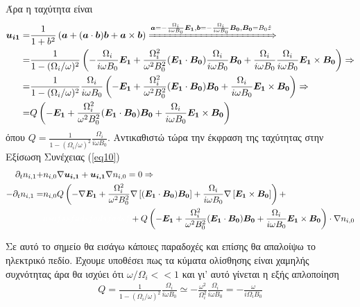 \documentclass[a4paper]{article}
\begin{document}
        Άρα η ταχύτητα είναι 
            \begin{align*}
                \bm{u_{i1}} =& \frac{1}{1+b^2}\left( \bm{a}+(\bm{a}\cdot\bm{b})\bm{b}+\bm{a}\times\bm{b}\right) \xRightarrow{\bm{a} = -\frac{\Omega_{i}}{i\omega B_0}\bm{E_1}, \bm{b} = - \frac{\Omega_i}{i\omega B_0}\bm{B_0}, \bm{B_0}=B_0\hat{z}}\\
                    =& \frac{1}{1-(\Omega_{i}/\omega)^2}\left( -\frac{\Omega_{i}}{i\omega B_0}\bm{E_1} + \frac{\Omega_{i}^2}{\omega^2 B_0^2} (\bm{E_1}\cdot\bm{B_0})\frac{\Omega_{i}}{i\omega B_0}\bm{B_0} + \frac{\Omega_{i}}{i\omega B_0}\frac{\Omega_{i}}{i\omega B_0}\bm{E_1}\times\bm{B_0}  \right) \Rightarrow \\
                    =& \frac{1}{1-(\Omega_{i}/\omega)^2} \frac{\Omega_i}{i\omega B_0}\left( -\bm{E_1} + \frac{\Omega_i^2}{\omega^2 B_0^2}(\bm{E_1}\cdot\bm{B_0})\bm{B_0}+\frac{\Omega_i}{i\omega B_0}\bm{E_1}\times\bm{B_0}\right)\Rightarrow\\
                    =& Q\left( -\bm{E_1} + \frac{\Omega_i^2}{\omega^2 B_0^2}(\bm{E_1}\cdot\bm{B_0})\bm{B_0}+\frac{\Omega_i}{i\omega B_0}\bm{E_1}\times\bm{B_0}\right)
            \end{align*}
            όπου $Q=\frac{1}{1-(\Omega_{i}/\omega)^2} \frac{\Omega_i}{i\omega B_0}$. Αντικαθιστώ τώρα την έκφραση της ταχύτητας στην Εξίσωση Συνέχειας (\ref{eq10})
                \begin{align*}
                    \partial_t n_{i,1} +& n_{i,0}\nabla\bm{u_{i,1}} + \bm{u_{i,1}}\nabla n_{i,0} = 0 \Rightarrow\\
                    -\partial_tn_{i,1}= &n_{i,0}Q\left( -\nabla\bm{E_1} + \frac{\Omega_i^2}{\omega^2 B_0^2}\nabla\left[(\bm{E_1}\cdot\bm{B_0})\bm{B_0}\right]+\frac{\Omega_i}{i\omega B_0}\nabla\left[\bm{E_1}\times\bm{B_0}\right]\right) +\\ 
                    &\textcolor{white}{asafssfadsfadsfadsf }+ Q\left( -\bm{E_1} + \frac{\Omega_i^2}{\omega^2 B_0^2}(\bm{E_1}\cdot\bm{B_0})\bm{B_0}+\frac{\Omega_i}{i\omega B_0}\bm{E_1}\times\bm{B_0}\right)\cdot\nabla n_{i,0}
                \end{align*}
                
                Σε αυτό το σημείο θα εισάγω κάποιες παραδοχές και επίσης θα απαλοίψω το ηλεκτρικό πεδίο. Έχουμε υποθέσει πως τα κύματα ολίσθησης είναι χαμηλής συχνότητας άρα θα ισχύει ότι $\omega/\Omega_i <<1$ και γι' αυτό γίνεται η εξής απλοποίηση 
                	\begin{align*} 
                		Q = \frac{1}{1-(\Omega_{i}/\omega)^2} \frac{\Omega_i}{i\omega B_0} \simeq -\frac{\omega^2}{\Omega_i^2}\frac{\Omega_i}{i\omega B_0} =-\frac{\omega}{i\Omega_iB_0}
                	\end{align*}
                	
\end{document}
